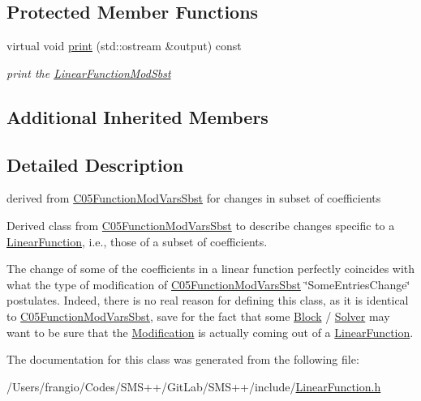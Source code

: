 \subsection*{Protected Member Functions}
\begin{DoxyCompactItemize}
\item 
\mbox{\label{class_s_m_spp__di__unipi__it_1_1_linear_function_mod_sbst_a2e7b9c9148a98c5c342e8c25cac95926}} 
virtual void \mbox{\hyperlink{class_s_m_spp__di__unipi__it_1_1_linear_function_mod_sbst_a2e7b9c9148a98c5c342e8c25cac95926}{print}} (std\+::ostream \&output) const
\begin{DoxyCompactList}\small\item\em print the \mbox{\hyperlink{class_s_m_spp__di__unipi__it_1_1_linear_function_mod_sbst}{Linear\+Function\+Mod\+Sbst}} \end{DoxyCompactList}\end{DoxyCompactItemize}
\subsection*{Additional Inherited Members}


\subsection{Detailed Description}
derived from \mbox{\hyperlink{class_s_m_spp__di__unipi__it_1_1_c05_function_mod_vars_sbst}{C05\+Function\+Mod\+Vars\+Sbst}} for changes in subset of coefficients 

Derived class from \mbox{\hyperlink{class_s_m_spp__di__unipi__it_1_1_c05_function_mod_vars_sbst}{C05\+Function\+Mod\+Vars\+Sbst}} to describe changes specific to a \mbox{\hyperlink{class_s_m_spp__di__unipi__it_1_1_linear_function}{Linear\+Function}}, i.\+e., those of a subset of coefficients.

The change of some of the coefficients in a linear function perfectly coincides with what the type of modification of \mbox{\hyperlink{class_s_m_spp__di__unipi__it_1_1_c05_function_mod_vars_sbst}{C05\+Function\+Mod\+Vars\+Sbst}} \char`\"{}\+Some\+Entries\+Change\char`\"{} postulates. Indeed, there is no real reason for defining this class, as it is identical to \mbox{\hyperlink{class_s_m_spp__di__unipi__it_1_1_c05_function_mod_vars_sbst}{C05\+Function\+Mod\+Vars\+Sbst}}, save for the fact that some \mbox{\hyperlink{class_s_m_spp__di__unipi__it_1_1_block}{Block}} / \mbox{\hyperlink{class_s_m_spp__di__unipi__it_1_1_solver}{Solver}} may want to be sure that the \mbox{\hyperlink{class_s_m_spp__di__unipi__it_1_1_modification}{Modification}} is actually coming out of a \mbox{\hyperlink{class_s_m_spp__di__unipi__it_1_1_linear_function}{Linear\+Function}}. 

The documentation for this class was generated from the following file\+:\begin{DoxyCompactItemize}
\item 
/\+Users/frangio/\+Codes/\+S\+M\+S++/\+Git\+Lab/\+S\+M\+S++/include/\mbox{\hyperlink{_linear_function_8h}{Linear\+Function.\+h}}\end{DoxyCompactItemize}
